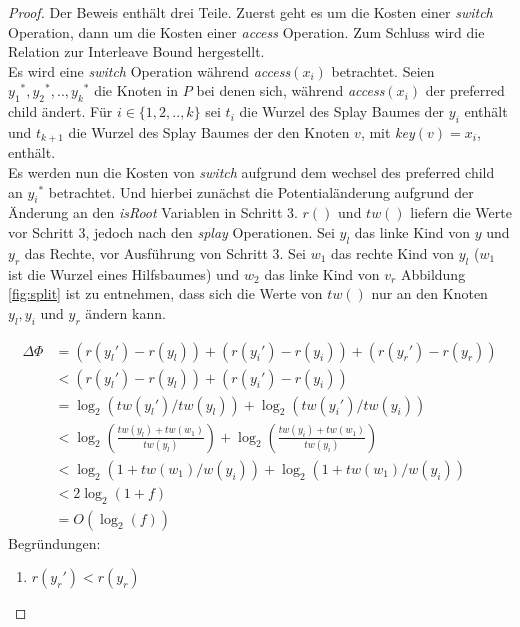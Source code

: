 \documentclass[a4paper,12pt]{article}
\begin{document}
\begin{proof}
	Der Beweis enthält drei Teile. Zuerst geht es um die Kosten einer \textit{switch} Operation, dann um die Kosten einer  \textit{access} Operation. Zum Schluss wird die Relation zur Interleave Bound hergestellt.\\
	Es wird eine \textit{switch} Operation während \textit{access}$\left(x_i\right)$ betrachtet. Seien ${y_1}^*, {y_2}^*,..,{y_k}^*$ die Knoten in $P$ bei denen sich, während  \textit{access}$\left(x_i\right)$ der preferred child ändert. Für $i \in \{1, 2,.., k\}$ sei $t_i$ die Wurzel des Splay Baumes der $y_i$ enthält und $t_{k+1}$ die Wurzel des Splay Baumes der den Knoten $v$, mit \textit{key}$\left(v\right) = x_i$, enthält.\\
	Es werden nun die Kosten von \textit{switch} aufgrund dem wechsel des preferred child an ${y_i}^*$ betrachtet. Und hierbei zunächst die Potentialänderung aufgrund der Änderung an den \textit{isRoot} Variablen in Schritt 3.  $r\left(\right)$ und $\mathit{tw}\left(\right)$ liefern die Werte vor Schritt 3, jedoch nach den \textit{splay} Operationen. Sei $y_l$ das linke Kind von $y$ und $y_r$ das Rechte, vor Ausführung von Schritt 3. Sei $w_1$ das rechte Kind von $y_l$ ($w_1$ ist die Wurzel eines Hilfsbaumes) und $w_2$ das linke Kind von $v_r$ Abbildung \ref{fig:split} ist zu entnehmen, dass sich die Werte von $\mathit{tw}\left(\right)$ nur an den Knoten $y_l, y_i$ und $y_r$ ändern kann.
	 
\begin{align}
	\Delta \Phi &= \left( r\left({y_l}'\right) - r\left({y_l}\right)\right) + \left( r\left({y_i}'\right) - r\left({y_i}\right)\right) + \left( r\left({y_r}'\right) - r\left({y_r}\right)\right)\\
	&< \left( r\left({y_l}'\right) - r\left({y_l}\right)\right) + \left( r\left({y_i}'\right) - r\left({y_i}\right)\right) \\
	&= \log_2\left( \mathit{tw}\left({y_l}'\right)  / \mathit{tw}\left({y_l}\right)  \right) +
	 \log_2\left( \mathit{tw}\left({y_i}'\right)  / \mathit{tw}\left({y_i}\right)  \right)\\
	&< \log_2\left( \frac{\mathit{tw}\left({y_l}\right) + \mathit{tw}\left({w_1} \right)}{\mathit{tw}\left({y_l}\right)} 	  \right) + 
	\log_2\left(\frac{\mathit{tw}\left({y_i}\right) + \mathit{tw}\left({w_1} \right)  }{\mathit{tw}\left({y_i}\right)}   \right)\\
	&<\log_2\left( 1 + \mathit{tw}\left({w_1}  	\right) / \mathit{w}\left({y_i}\right) \right)  +
	\log_2 \left(1 + \mathit{tw}\left({w_1}   	\right) / \mathit{w}\left({y_i}\right) \right)  \\
	&< 2 \log_2 \left(1 + f\right)\\
	&= O\left(\log_2 \left(f\right)\right)
\end{align}
Begründungen:
\begin{enumerate}
	\item $ r\left({y_r}'\right) < r\left({y_r}\right)$
\end{enumerate}	
	
\end{proof}

\newpage


\end{document}

